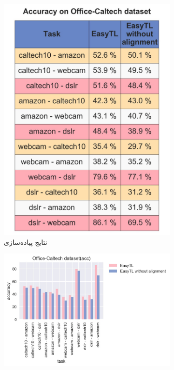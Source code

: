 \begin{figure}[H]
\begin{subfigure}[b]{0.2\textwidth}
		\includegraphics[width=\linewidth]{images/3_1.jpg}
		\caption{نتایج پیاده‌سازی}
	\end{subfigure}%
	\begin{subfigure}[b]{0.3\textwidth}
		\centering
		\includegraphics[width=\linewidth]{images/3_2.jpg}

\end{subfigure}
\end{figure}
